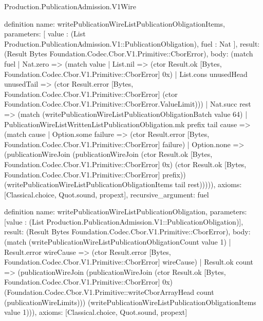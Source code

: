 \begin{lexlean}{Production.PublicationAdmission.V1Wire}
\begin{semanticmodule}
definition{
  name: writePublicationWireListPublicationObligationItems,
  parameters: [
    value : (List Production.PublicationAdmission.V1::PublicationObligation),
    fuel : Nat
  ],
  result: (Result Bytes Foundation.Codec.Cbor.V1.Primitive::CborError),
  body: (match fuel
    | Nat.zero => (match value
      | List.nil => (ctor Result.ok [Bytes, Foundation.Codec.Cbor.V1.Primitive::CborError] 0x)
      | List.cons unusedHead unusedTail => (ctor Result.error [Bytes, Foundation.Codec.Cbor.V1.Primitive::CborError] (ctor Foundation.Codec.Cbor.V1.Primitive::CborError.ValueLimit)))
    | Nat.succ rest => (match (writePublicationWireListPublicationObligationBatch value 64)
      | PublicationWireListWrittenListPublicationObligation.mk prefix tail cause => (match cause
        | Option.some failure => (ctor Result.error [Bytes, Foundation.Codec.Cbor.V1.Primitive::CborError] failure)
        | Option.none => (publicationWireJoin (publicationWireJoin (ctor Result.ok [Bytes, Foundation.Codec.Cbor.V1.Primitive::CborError] 0x) (ctor Result.ok [Bytes, Foundation.Codec.Cbor.V1.Primitive::CborError] prefix)) (writePublicationWireListPublicationObligationItems tail rest))))),
  axioms: [Classical.choice, Quot.sound, propext],
  recursive_argument: fuel
}

definition{
  name: writePublicationWireListPublicationObligation,
  parameters: [value : (List Production.PublicationAdmission.V1::PublicationObligation)],
  result: (Result Bytes Foundation.Codec.Cbor.V1.Primitive::CborError),
  body: (match (writePublicationWireListPublicationObligationCount value 1)
    | Result.error wireCause => (ctor Result.error [Bytes, Foundation.Codec.Cbor.V1.Primitive::CborError] wireCause)
    | Result.ok count => (publicationWireJoin (publicationWireJoin (ctor Result.ok [Bytes, Foundation.Codec.Cbor.V1.Primitive::CborError] 0x) (Foundation.Codec.Cbor.V1.Primitive::writeCborArrayHead count (publicationWireLimits))) (writePublicationWireListPublicationObligationItems value 1))),
  axioms: [Classical.choice, Quot.sound, propext]
}


\end{semanticmodule}
\end{lexlean}

